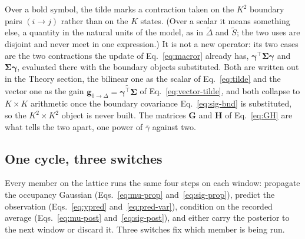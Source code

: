 \begin{appendixbox}
Over a bold symbol, the tilde marks a contraction taken on the $K^2$ boundary pairs $(i\to j)$
rather than on the $K$ states. (Over a scalar it means something else, a quantity in the natural
units of the model, as in $\widetilde{\Delta}$ and $\widetilde{S}$; the two uses are disjoint and
never meet in one expression.) It is not a new operator: its two cases are the two contractions the update of
Eq.~\ref{eq:macror} already has, $\bm{\gamma}^\top\bm{\Sigma}\bm{\gamma}$ and
$\bm{\Sigma}\bm{\gamma}$, evaluated there with the boundary objects substituted. Both are written out in the Theory section, the
bilinear one as the scalar of Eq.~\ref{eq:tilde} and the vector one as the gain
$\mathbf{g}_{0\to\Delta}=\widetilde{\bm{\gamma}^\top\bm{\Sigma}}$ of Eq.~\ref{eq:vector-tilde}, and both
collapse to $K\times K$ arithmetic once the boundary covariance Eq.~\ref{eq:sig-bnd} is
substituted, so the $K^2\times K^2$ object is never built. The matrices $\mathbf{G}$ and
$\mathbf{H}$ of Eq.~\ref{eq:GH} are what tells the two apart, one power of $\bar{\gamma}$
against two.

\subsection*{One cycle, three switches}

Every member on the lattice runs the same four steps on each window: propagate the occupancy
Gaussian (Eqs.~\ref{eq:mu-prop} and~\ref{eq:sig-prop}), predict the observation
(Eqs.~\ref{eq:ypred} and~\ref{eq:pred-var}), condition on the recorded average
(Eqs.~\ref{eq:mu-post} and~\ref{eq:sig-post}), and either carry the posterior to the next
window or discard it. Three switches fix which member is being run.


\end{appendixbox}
